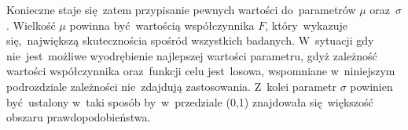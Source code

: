 Konieczne staje się~zatem przypisanie pewnych wartości do~parametrów $\mu$ oraz~$\sigma$. Wielkość  $\mu$ powinna być~wartością współczynnika $F$, który~wykazuje się,~największą skutecznościa spośród wszystkich badanych. W~sytuacji gdy nie~jest~możliwe wyodrębienie najlepszej wartości parametru, gdyż zależność wartości współczynnika oraz~funkcji celu jest~losowa, wspomniane w~niniejszym podrozdziale zależności nie~zdajdują zastosowania. Z~kolei parametr $\sigma$ powinien być~ustalony w~taki sposób by~w~przedziale (0,1) znajdowała się~większość obszaru prawdopodobieństwa. 



































